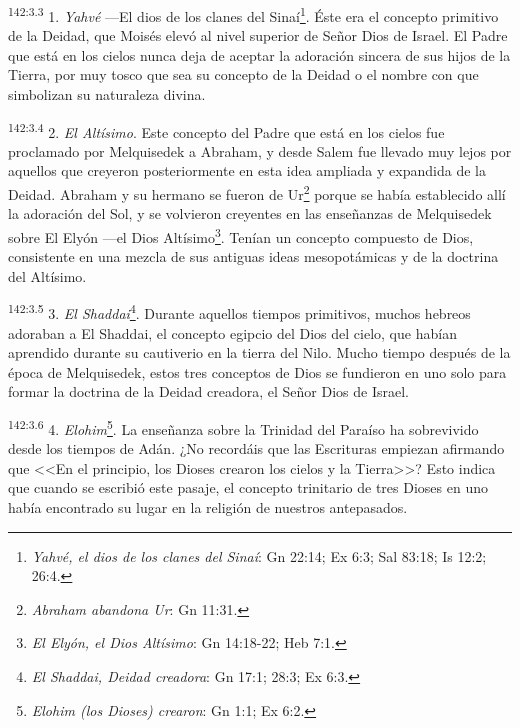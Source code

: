 \par 
\textsuperscript{142:3.3} 1. \textit{Yahvé} ---El dios de los clanes del Sinaí\footnote{\textit{Yahvé, el dios de los clanes del Sinaí}: Gn 22:14; Ex 6:3; Sal 83:18; Is 12:2; 26:4.}. Éste era el concepto primitivo de la Deidad, que Moisés elevó al nivel superior de Señor Dios de Israel. El Padre que está en los cielos nunca deja de aceptar la adoración sincera de sus hijos de la Tierra, por muy tosco que sea su concepto de la Deidad o el nombre con que simbolizan su naturaleza divina.

\par 
\textsuperscript{142:3.4} 2. \textit{El Altísimo}. Este concepto del Padre que está en los cielos fue proclamado por Melquisedek a Abraham, y desde Salem fue llevado muy lejos por aquellos que creyeron posteriormente en esta idea ampliada y expandida de la Deidad. Abraham y su hermano se fueron de Ur\footnote{\textit{Abraham abandona Ur}: Gn 11:31.} porque se había establecido allí la adoración del Sol, y se volvieron creyentes en las enseñanzas de Melquisedek sobre El Elyón ---el Dios Altísimo\footnote{\textit{El Elyón, el Dios Altísimo}: Gn 14:18-22; Heb 7:1.}. Tenían un concepto compuesto de Dios, consistente en una mezcla de sus antiguas ideas mesopotámicas y de la doctrina del Altísimo.

\par 
\textsuperscript{142:3.5} 3. \textit{El Shaddai}\footnote{\textit{El Shaddai, Deidad creadora}: Gn 17:1; 28:3; Ex 6:3.}. Durante aquellos tiempos primitivos, muchos hebreos adoraban a El Shaddai, el concepto egipcio del Dios del cielo, que habían aprendido durante su cautiverio en la tierra del Nilo. Mucho tiempo después de la época de Melquisedek, estos tres conceptos de Dios se fundieron en uno solo para formar la doctrina de la Deidad creadora, el Señor Dios de Israel.

\par 
\textsuperscript{142:3.6} 4. \textit{Elohim}\footnote{\textit{Elohim (los Dioses) crearon}: Gn 1:1; Ex 6:2.}. La enseñanza sobre la Trinidad del Paraíso ha sobrevivido desde los tiempos de Adán. ¿No recordáis que las Escrituras empiezan afirmando que <<En el principio, los Dioses crearon los cielos y la Tierra>>? Esto indica que cuando se escribió este pasaje, el concepto trinitario de tres Dioses en uno había encontrado su lugar en la religión de nuestros antepasados.


